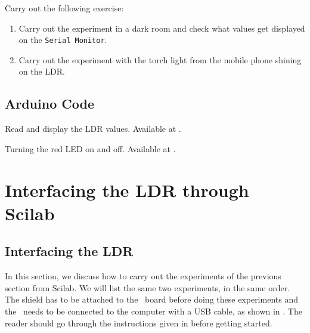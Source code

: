 \begin{exercise}
  Carry out the following exercise:
  \begin{enumerate}
    \item Carry out the experiment in a dark room and check what values
          get displayed on the {\tt Serial Monitor}.
    \item Carry out the experiment with the torch light from the mobile
          phone shining on the LDR.
  \end{enumerate}
\end{exercise}

\subsection{Arduino Code}
\label{sec:ldr-arduino-code}

\begin{ardcode}
  {Read and display the LDR values.  Available at
    .}
  \label{ard:ldr-read}
  
\end{ardcode}

\begin{ardcode}
  {Turning the red LED on and off.  Available at
    .}
  \label{ard:ldr-led}
  
\end{ardcode}

\section{Interfacing the LDR through Scilab}
\subsection{Interfacing the LDR}
In this section, we discuss how to carry out the experiments of the
previous section from Scilab. We will list the same two experiments,
in the same order.  The shield has to be attached to the \arduino\ board
before doing these experiments and the \arduino\ needs to be connected to the computer 
with a USB cable, as shown in .
The reader should go through the instructions given in
 before getting started. 


